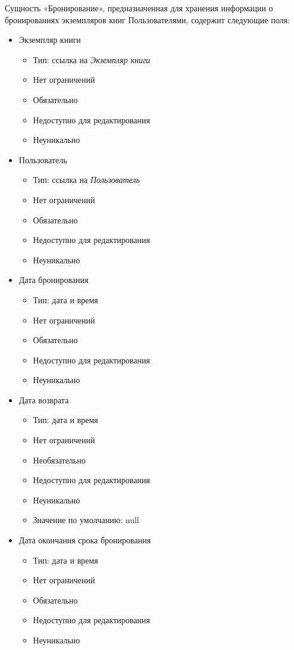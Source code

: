 \documentclass[data-specification.tex]{subfiles}
\begin{document}
\par
Сущность «Бронирование», предназначенная для хранения информации о бронированиях экземпляров книг Пользователями, содержит следующие поля:
\begin{itemize}
    \item Экземпляр книги
    \begin{itemize}
        \item Тип: ссылка на \textsl{Экземпляр книги}
        \item Нет ограничений
        \item Обязательно
        \item Недоступно для редактирования
        \item Неуникально
    \end{itemize}
    \item Пользователь
    \begin{itemize}
        \item Тип: ссылка на \textsl{Пользователь}
        \item Нет ограничений
        \item Обязательно
        \item Недоступно для редактирования
        \item Неуникально
    \end{itemize}
    \item Дата бронирования
    \begin{itemize}
        \item Тип: дата и время
        \item Нет ограничений
        \item Обязательно
        \item Недоступно для редактирования
        \item Неуникально
    \end{itemize}
    \item Дата возврата
    \begin{itemize}
        \item Тип: дата и время
        \item Нет ограничений
        \item Необязательно
        \item Недоступно для редактирования
        \item Неуникально
        \item Значение по умолчанию: null
    \end{itemize}
    \item Дата окончания срока бронирования
    \begin{itemize}
        \item Тип: дата и время
        \item Нет ограничений
        \item Обязательно
        \item Недоступно для редактирования
        \item Неуникально
    \end{itemize}
\end{itemize}
\end{document}
